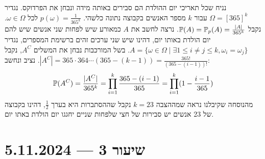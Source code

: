 נניח שכל תאריכי יום ההולדת הם סבירים באותה מידה ונבחן את הפרדוקס.
נגדיר $\Omega = {[365]}^k$ עבור $k$ מספר האנשים בקבוצה נתונה כלשהי.
$p(\omega) = \frac{1}{{365}^k}$ לכל $\omega \in \Omega$.
נקבל $\mathbb{P}(A) = \mathbb{P}_p(A) = \frac{|A|}{365^k}$.
נרצה לחשב את $A$ כמאורע שיש לפחות שני אנשים שיש להם יום הולדת באותו יום, דהינו שיש שני ערכים זהים ברשימת המספרים, נגדיר $A = \{ \omega \in \Omega \mid \exists 1 \le i \ne j \le k, \omega_i = \omega_j \}$.
בשל המורכבות נבחן את המשלים $A^C$, נקבל $|A^C| = 365 \cdot 364 \cdots (365 - (k - 1)) = \frac{365!}{(365 - (i - 1))!}$.
נציב ונחשב:
\[
	\mathbb{P}(A^C) = \frac{|A^C|}{365^k} = \prod_{i = 1}^k \frac{365 - (i - 1)}{365} = \prod_{i = 1}^k (1 - \frac{i - 1}{365})
\]
מהנוסחה שקיבלנו נראה שמההצבה $k = 23$ נקבל שההסתברות היא בערך $\frac{1}{2}$, דהינו בקבוצה של 23 אנשים יש סבירות של חצי שלפחות שניים יחגגו יום הולדת באתו יום.

\section{שיעור 3 --- 5.11.2024}

